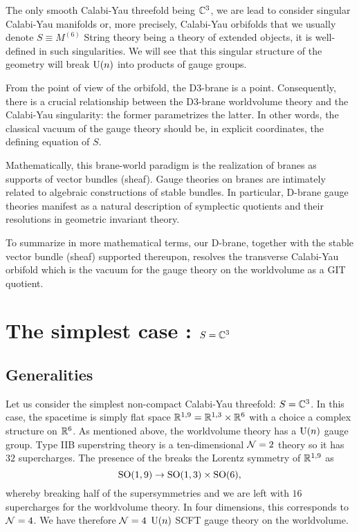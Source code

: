 \documentclass[a4paper,11pt]{article}
\begin{document}
    The only smooth Calabi-Yau threefold being $\mathbb{C}^3$, we are lead to consider singular Calabi-Yau manifolds or, more precisely, Calabi-Yau orbifolds that we usually denote $S\equiv M^{(6)}$ String theory being a theory of extended objects, it is well-defined in such singularities. We will see that this singular structure of the geometry will break $\text{U}(n)$ into products of gauge groups.
    
    From the point of view of the orbifold, the D$3$-brane is a point. Consequently, there is a crucial relationship between the D$3$-brane worldvolume theory and the Calabi-Yau singularity: the former parametrizes the latter. In other words, the classical vacuum of the gauge theory should be, in explicit coordinates, the defining equation of $S$.

    Mathematically, this brane-world paradigm is the realization of branes as supports of vector bundles (sheaf). Gauge theories on branes are intimately related to algebraic constructions of stable bundles. In particular, D-brane gauge theories manifest as a natural description of symplectic quotients and their resolutions in geometric invariant theory.

    To summarize in more mathematical terms, our D-brane, together with the stable vector bundle (sheaf) supported thereupon, resolves the transverse Calabi-Yau orbifold which is the vacuum for the gauge theory on the worldvolume as a GIT quotient.

\section{The simplest case : $S=\mathbb{C}^3$}

    \subsection{Generalities}

        Let us consider the simplest non-compact Calabi-Yau threefold: $S=\mathbb{C}^3$. In this case, the spacetime is simply flat space $\mathbb{R}^{1,9}=\mathbb{R}^{1,3}\times\mathbb{R}^6$ with a choice a complex structure on $\mathbb{R}^6$. As mentioned above, the worldvolume theory has a $\text{U}(n)$ gauge group. Type IIB superstring theory is a ten-dimensional $\mathcal{N}=2$ theory so it has $32$ supercharges. The presence of the breaks the Lorentz symmetry of $\mathbb{R}^{1,9}$ as
        \begin{equation}
            \text{SO}(1,9)\to\text{SO}(1,3)\times\text{SO}(6),
        \end{equation}
        whereby breaking half of the supersymmetries and we are left with $16$ supercharges for the worldvolume theory. In four dimensions, this corresponds to $\mathcal{N}=4$. We have therefore $\mathcal{N}=4$ $\text{U}(n)$ SCFT gauge theory on the worldvolume.
\end{document}
